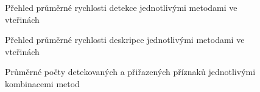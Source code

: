 \begin{figure}[htp] 
	\caption{Přehled průměrné rychlosti detekce jednotlivými metodami ve vteřinách} \label{det_times}
\end{figure}

\begin{figure}[htp] 
	\caption{Přehled průměrné rychlosti deskripce jednotlivými metodami ve vteřinách} \label{desc_times}
\end{figure}

\begin{figure}[htp] 
	\caption{Průměrné počty detekovaných a přiřazených příznaků jednotlivými kombinacemi metod}	\label{match_count}
\end{figure}



